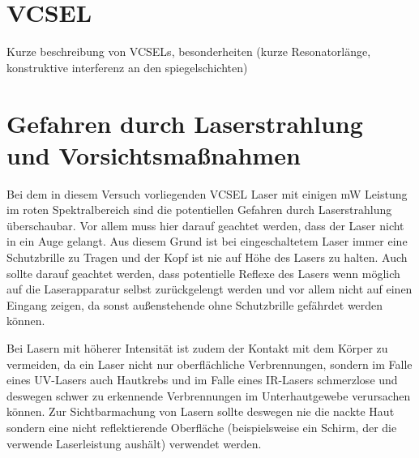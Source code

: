\documentclass[bigchapter,colorback,accentcolor=tud4b,linedtoc,11pt]{tudreport}
\numberwithin{equation}{subsection}
\begin{document}

% 								
% 								
% 								

\section{VCSEL}
Kurze beschreibung von VCSELs, besonderheiten (kurze Resonatorlänge, konstruktive interferenz an den spiegelschichten)

\section{Gefahren durch Laserstrahlung und Vorsichtsmaßnahmen}
Bei dem in diesem Versuch vorliegenden VCSEL Laser mit einigen mW Leistung im roten Spektralbereich sind die potentiellen Gefahren durch Laserstrahlung überschaubar. Vor allem muss hier darauf geachtet werden, dass der Laser nicht in ein Auge gelangt. Aus diesem Grund ist bei eingeschaltetem Laser immer eine Schutzbrille zu Tragen und der Kopf ist nie auf Höhe des Lasers zu halten. Auch sollte darauf geachtet werden, dass potentielle Reflexe des Lasers wenn möglich auf die Laserapparatur selbst zurückgelengt werden und vor allem nicht auf einen Eingang zeigen, da sonst außenstehende ohne Schutzbrille gefährdet werden können.

Bei Lasern mit höherer Intensität ist zudem der Kontakt mit dem Körper zu vermeiden, da ein Laser nicht nur oberflächliche Verbrennungen, sondern im Falle eines UV-Lasers auch Hautkrebs und im Falle eines IR-Lasers schmerzlose und deswegen schwer zu erkennende Verbrennungen im Unterhautgewebe verursachen können. Zur Sichtbarmachung von Lasern sollte deswegen nie die nackte Haut sondern eine nicht reflektierende Oberfläche (beispielsweise ein Schirm, der die verwende Laserleistung aushält) verwendet werden.
\end{document}
